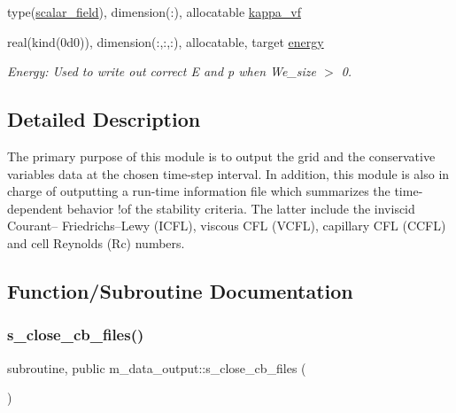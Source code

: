 \begin{DoxyCompactItemize}
\item 
type(\hyperlink{structm__derived__types_1_1scalar__field}{scalar\+\_\+field}), dimension(\+:), allocatable \hyperlink{namespacem__data__output_a1b71fe1b222b55aa5315838816902b33}{kappa\+\_\+vf}
\item 
real(kind(0d0)), dimension(\+:,\+:,\+:), allocatable, target \hyperlink{namespacem__data__output_a8ef7ff0b857e6a25f92ddfba6ffdc731}{energy}
\begin{DoxyCompactList}\small\item\em Energy\+: Used to write out correct E and p when We\+\_\+size $>$ 0. \end{DoxyCompactList}\end{DoxyCompactItemize}



\subsection{Detailed Description}
The primary purpose of this module is to output the grid and the conservative variables data at the chosen time-\/step interval. In addition, this module is also in charge of outputting a run-\/time information file which summarizes the time-\/dependent behavior !of the stability criteria. The latter include the inviscid Courant– Friedrichs–\+Lewy (I\+C\+FL), viscous C\+FL (V\+C\+FL), capillary C\+FL (C\+C\+FL) and cell Reynolds (Rc) numbers. 

\subsection{Function/\+Subroutine Documentation}
\mbox{\label{namespacem__data__output_aa0eb8be31f69888d750e18df197c6011}} 
\subsubsection{\texorpdfstring{s\+\_\+close\+\_\+cb\+\_\+files()}{s\_close\_cb\_files()}}
{\footnotesize\ttfamily subroutine, public m\+\_\+data\+\_\+output\+::s\+\_\+close\+\_\+cb\+\_\+files (\begin{DoxyParamCaption}{ }\end{DoxyParamCaption})}



